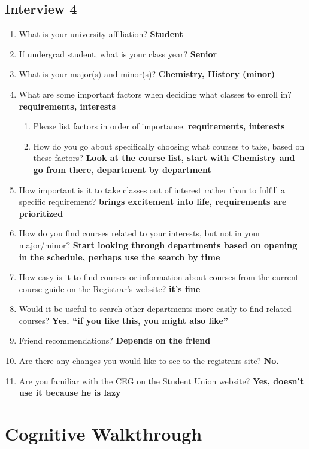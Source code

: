 \documentclass[12pt]{report}
\begin{document}
\subsection{Interview 4}

\begin{enumerate}
\item What is your university affiliation? \textbf{Student}
\item If undergrad student, what is your class year? \textbf{Senior}
\item What is your major(s) and minor(s)? \textbf{Chemistry, History (minor)}
\item What are some important factors when deciding what classes to enroll in? \textbf{requirements, interests}
	\begin{enumerate}
    \item Please list factors in order of importance. \textbf{requirements, interests}
    \item How do you go about specifically choosing what courses to take, based on these factors? \textbf{Look at the course list, start with Chemistry and go from there, department by department}
    \end{enumerate}
\item How important is it to take classes out of interest rather than to fulfill a specific requirement? \textbf{brings excitement into life, requirements are prioritized}
\item How do you find courses related to your interests, but not in your major/minor? \textbf{Start looking through departments based on opening in the schedule, perhaps use the search by time}
\item How easy is it to find courses or information about courses from the current course guide on the Registrar's website? \textbf{it's fine}
\item Would it be useful to search other departments more easily to find related courses? \textbf{Yes. ``if you like this, you might also like''}
\item Friend recommendations? \textbf{Depends on the friend}
\item Are there any changes you would like to see to the registrars site? \textbf{No.}
\item Are you familiar with the CEG on the Student Union website? \textbf{Yes, doesn't use it because he is lazy}
\end{enumerate}

\section{Cognitive Walkthrough}
\end{document}
